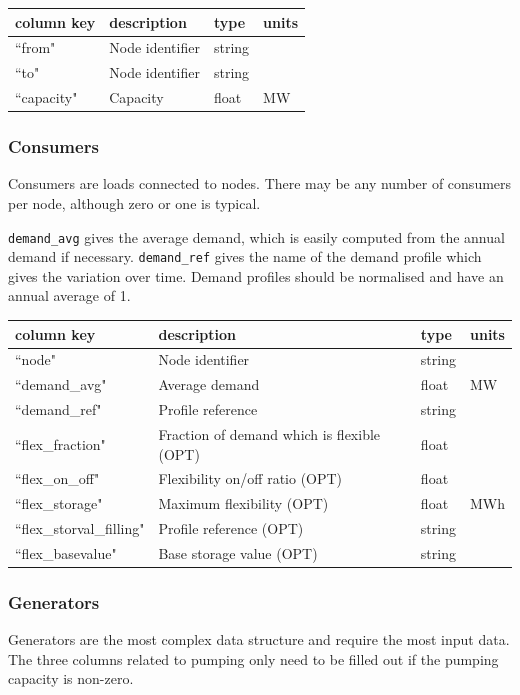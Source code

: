 \documentclass{article}
\begin{document}
\medskip
\begin{tabular}{llll}
	\hline
	column key & description & type & units \\
	\hline
	``from"	&	Node identifier 	& string	& \\
	``to"		&	Node identifier	& string	& \\
	``capacity"		&	Capacity & float		& MW \\
	\hline
\end{tabular}


\subsubsection{Consumers}
Consumers are loads connected to nodes. There may be any number of consumers per node, although zero or one is typical.

\texttt{demand\_avg} gives the average demand, which is easily computed from the annual demand if necessary.
\texttt{demand\_ref} gives the name of the demand profile which gives the variation over time. Demand profiles should be normalised and have an annual average of 1.

\medskip
\begin{tabular}{llll}
	\hline
	column key & description & type & units \\
	\hline
	``node"			& Node identifier 	& string		& \\
	``demand\_avg"		& Average demand	& float		& MW \\
	``demand\_ref"		& Profile reference	& string	&  \\
	``flex\_fraction"		& Fraction of demand which is flexible (OPT) 	& float	& \\
	``flex\_on\_off"		& Flexibility on/off ratio (OPT)		& float		&  \\
	``flex\_storage"				& Maximum flexibility (OPT)	& float		& MWh \\
	``flex\_storval\_filling"		& Profile reference (OPT)	& string	&  \\
	``flex\_basevalue"			& Base storage value (OPT)	& string	& \\
	\hline
\end{tabular}


\subsubsection{Generators}
Generators are the most complex data structure and require the most input data.
The three columns related to pumping only need to be filled out if the pumping capacity is non-zero.
\end{document}

